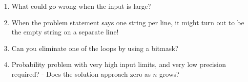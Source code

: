 \documentclass[12pt]{book}
\begin{document}
\begin{enumerate}
\begin{enumerate}[label = \roman*.]
\item What could go wrong when the input is large?
\item When the problem statement says one string per line, it might turn out to be the empty string on a separate line!
\item Can you eliminate one of the loops by using a bitmask?
\item Probability problem with very high input limits, and very low precision required? - Does the solution approach zero as $n$ grows?
\end{enumerate}
\end{enumerate}
\end{document}
